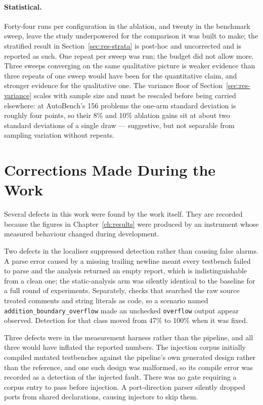 \documentclass[11pt,a4paper,titlepage=false]{scrreprt}
\begin{document}
\paragraph{Statistical.} Forty-four runs per configuration in the ablation, and twenty in the
benchmark sweep, leave the study underpowered for the comparison it was built to make; the
stratified result in Section~\ref{sec:res-strata} is post-hoc and uncorrected and is reported
as such. One repeat per sweep was run; the budget did not allow more. Three sweeps converging
on the same qualitative picture is weaker evidence than three repeats of one sweep would have
been for the quantitative claim, and stronger evidence for the qualitative one. The variance
floor of Section~\ref{sec:res-variance} scales with sample size and must be rescaled before
being carried elsewhere: at AutoBench's 156 problems the one-arm standard deviation is
roughly four points, so their 8\% and 10\% ablation gains sit at about two standard
deviations of a single draw --- suggestive, but not separable from sampling variation without
repeats.

\section{Corrections Made During the Work}\label{sec:disc-corrections}

Several defects in this work were found by the work itself. They are recorded because the
figures in Chapter~\ref{ch:results} were produced by an instrument whose measured behaviour
changed during development.

Two defects in the localiser suppressed detection rather than causing false alarms. A parse
error caused by a missing trailing newline meant every testbench failed to parse and the
analysis returned an empty report, which is indistinguishable from a clean one; the
static-analysis arm was silently identical to the baseline for a full round of experiments.
Separately, checks that searched the raw source treated comments and string literals as
code, so a scenario named \texttt{addition\_boundary\_overflow} made an unchecked
\texttt{overflow} output appear observed. Detection for that class moved from 47\% to 100\%
when it was fixed.

Three defects were in the measurement harness rather than the pipeline, and all three would
have inflated the reported numbers. The injection corpus initially compiled mutated
testbenches against the pipeline's own generated design rather than the reference, and one
such design was malformed, so its compile error was recorded as a detection of the injected
fault. There was no gate requiring a corpus entry to pass before injection. A port-direction
parser silently dropped ports from shared declarations, causing injectors to skip them.
\end{document}
